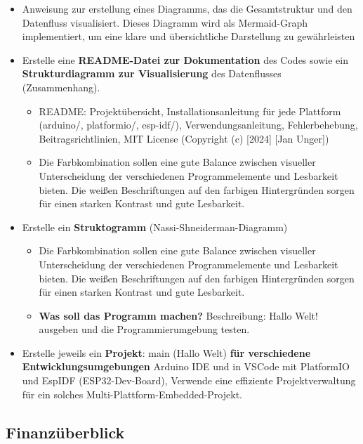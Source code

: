 \documentclass{vorlage-design-main}
\begin{document}
\begin{itemize}
\item
  Anweisung zur erstellung eines Diagramms, das die Gesamtstruktur und
  den Datenfluss visualisiert. Dieses Diagramm wird als Mermaid-Graph
  implementiert, um eine klare und übersichtliche Darstellung zu
  gewährleisten
\item
  Erstelle eine \textbf{README-Datei zur Dokumentation} des Codes sowie
  ein \textbf{Strukturdiagramm zur Visualisierung} des Datenflusses
  (Zusammenhang).

  \begin{itemize}

  \item
    README: Projektübersicht, Installationsanleitung für jede Plattform
    (arduino/, platformio/, esp-idf/), Verwendungsanleitung,
    Fehlerbehebung, Beitragsrichtlinien, MIT License (Copyright (c)
    {[}2024{]} {[}Jan Unger{]})
  \item
    Die Farbkombination sollen eine gute Balance zwischen visueller
    Unterscheidung der verschiedenen Programmelemente und Lesbarkeit
    bieten. Die weißen Beschriftungen auf den farbigen Hintergründen
    sorgen für einen starken Kontrast und gute Lesbarkeit.
  \end{itemize}
\item
  Erstelle ein \textbf{Struktogramm} (Nassi-Shneiderman-Diagramm)

  \begin{itemize}

  \item
    Die Farbkombination sollen eine gute Balance zwischen visueller
    Unterscheidung der verschiedenen Programmelemente und Lesbarkeit
    bieten. Die weißen Beschriftungen auf den farbigen Hintergründen
    sorgen für einen starken Kontrast und gute Lesbarkeit.
  \item
    \textbf{Was soll das Programm machen?} Beschreibung: Hallo Welt!
    ausgeben und die Programmierumgebung testen.
  \end{itemize}
\item
  Erstelle jeweils ein \textbf{Projekt}: main (Hallo Welt) \textbf{für
  verschiedene Entwicklungsumgebungen} Arduino IDE und in VSCode mit
  PlatformIO und EspIDF (ESP32-Dev-Board), Verwende eine effiziente
  Projektverwaltung für ein solches Multi-Plattform-Embedded-Projekt.
\end{itemize}

\subsection{Finanzüberblick}\label{finanzueberblick}
\end{document}
